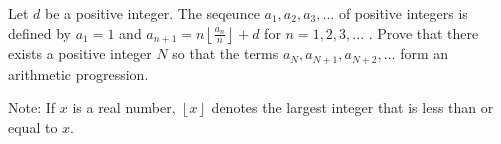Let $d$ be a positive integer.
The seqeunce $a_1, a_2, a_3,...$ of positive integers is defined by  $a_1 = 1$ and $a_{n + 1} = n\left \lfloor \frac{a_n}{n}  \right \rfloor+ d$ for $n = 1,2,3, ...$ .
Prove that there exists a positive integer $N$ so that the terms $a_N,a_{N + 1}, a_{N + 2},...$ form an arithmetic progression.

Note: If $x$ is a real number, $\left \lfloor  x \right \rfloor $ denotes the largest integer that is less than or equal to $x$.